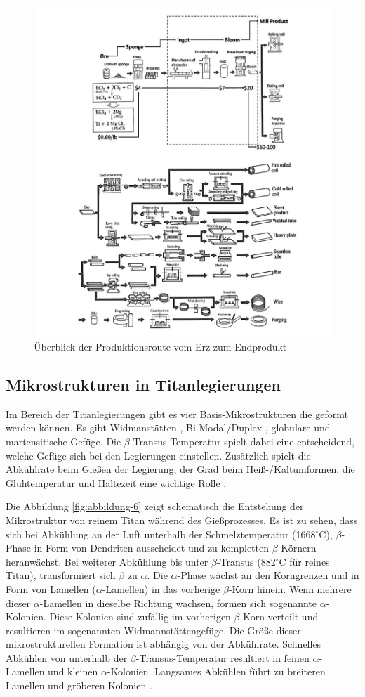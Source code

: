 \begin{figure}[h]
	\centering
	\includegraphics[width=0.7\linewidth]{./Bilder/Abbildung 2}
	\caption[Abbildung 2]{Überblick der Produktionsroute vom Erz zum Endprodukt \cite{M.J.Donachie.2010}}
	\label{fig:abbildung-2}
\end{figure}

\pagebreak

\subsection{Mikrostrukturen in Titanlegierungen}
Im Bereich der Titanlegierungen gibt es vier Basis-Mikrostrukturen die geformt werden können. Es gibt Widmanstätten-, Bi-Modal/Duplex-, globulare und martensitische Gefüge. Die $\beta$-Transus Temperatur spielt dabei eine entscheidend, welche Gefüge sich bei den Legierungen einstellen. Zusätzlich spielt die Abkühlrate beim Gießen der Legierung, der Grad beim Heiß-/Kaltumformen, die Glühtemperatur und Haltezeit eine wichtige Rolle \cite{C.Leyens.2005,Lutjering.2007,Boyer.2007,M.J.Donachie.2010}.

Die Abbildung \ref{fig:abbildung-6} zeigt schematisch die Entstehung der Mikrostruktur von reinem Titan während des Gießprozesses. Es ist zu sehen, dass sich bei Abkühlung an der Luft unterhalb der Schmelztemperatur (1668$^\circ$C), $\beta$-Phase in Form von Dendriten ausscheidet und zu kompletten $\beta$-Körnern heranwächst. Bei weiterer Abkühlung bis unter $\beta$-Transus (882$^\circ$C für reines Titan), transformiert sich $\beta$ zu $\alpha$. Die $\alpha$-Phase wächst an den Korngrenzen und in Form von Lamellen ($\alpha$-Lamellen) in das vorherige $\beta$-Korn hinein. Wenn mehrere dieser $\alpha$-Lamellen in dieselbe Richtung wachsen, formen sich sogenannte $\alpha$-Kolonien. Diese Kolonien sind zufällig im vorherigen $\beta$-Korn verteilt und resultieren im sogenannten Widmannstättengefüge. Die Größe dieser mikrostrukturellen Formation ist abhängig von der Abkühlrate. Schnelles Abkühlen von unterhalb der $\beta$-Transus-Temperatur resultiert in feinen $\alpha$-Lamellen und kleinen $\alpha$-Kolonien. Langsames Abkühlen führt zu breiteren Lamellen und gröberen Kolonien \cite{C.Leyens.2005,Lutjering.2007,Boyer.2007,M.J.Donachie.2010}. 

